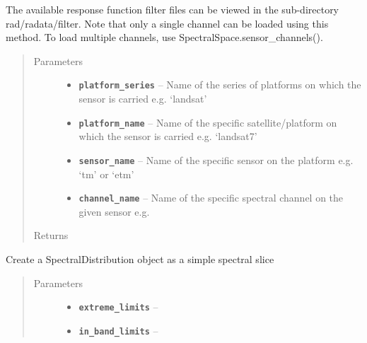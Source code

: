\documentclass[a4paper,10pt,english]{sphinxmanual}
\begin{document}
\begin{fulllineitems}
\begin{fulllineitems}
The available response function filter files can be viewed in the sub-directory rad/radata/filter.
Note that only a single channel can be loaded using this method. To load multiple channels, use
SpectralSpace.sensor\_channels().
\begin{quote}\begin{description}
\item[{Parameters}] \leavevmode\begin{itemize}
\item {} 
\textbf{\texttt{platform\_series}} -- Name of the series of platforms on which the sensor is carried e.g. `landsat'

\item {} 
\textbf{\texttt{platform\_name}} -- Name of the specific satellite/platform on which the sensor is carried
e.g. `landsat7'

\item {} 
\textbf{\texttt{sensor\_name}} -- Name of the specific sensor on the platform e.g. `tm' or `etm'

\item {} 
\textbf{\texttt{channel\_name}} -- Name of the specific spectral channel on the given sensor e.g.

\end{itemize}

\item[{Returns}] \leavevmode


\end{description}\end{quote}

\end{fulllineitems}


\begin{fulllineitems}
\label{packages:radute.SpectralDistribution.spectral_slice}
Create a SpectralDistribution object as a simple spectral slice
\begin{quote}\begin{description}
\item[{Parameters}] \leavevmode\begin{itemize}
\item {} 
\textbf{\texttt{extreme\_limits}} -- 

\item {} 
\textbf{\texttt{in\_band\_limits}} -- 


\end{itemize}
\end{description}
\end{quote}
\end{fulllineitems}
\end{fulllineitems}
\end{document}
